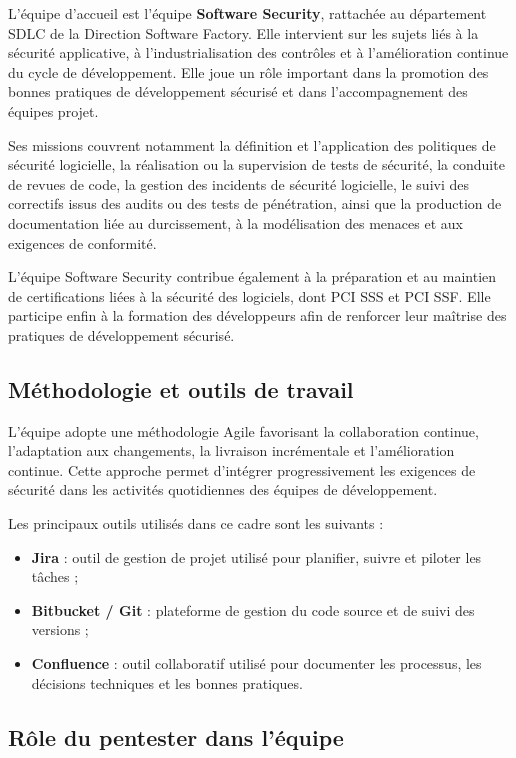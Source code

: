 \documentclass[12pt,a4paper]{report}
\begin{document}
L'équipe d'accueil est l'équipe \textbf{Software Security}, rattachée au département SDLC de la Direction Software Factory. Elle intervient sur les sujets liés à la sécurité applicative, à l'industrialisation des contrôles et à l'amélioration continue du cycle de développement. Elle joue un rôle important dans la promotion des bonnes pratiques de développement sécurisé et dans l'accompagnement des équipes projet.

Ses missions couvrent notamment la définition et l'application des politiques de sécurité logicielle, la réalisation ou la supervision de tests de sécurité, la conduite de revues de code, la gestion des incidents de sécurité logicielle, le suivi des correctifs issus des audits ou des tests de pénétration, ainsi que la production de documentation liée au durcissement, à la modélisation des menaces et aux exigences de conformité.

L'équipe Software Security contribue également à la préparation et au maintien de certifications liées à la sécurité des logiciels, dont PCI SSS et PCI SSF. Elle participe enfin à la formation des développeurs afin de renforcer leur maîtrise des pratiques de développement sécurisé.

\subsection{Méthodologie et outils de travail}

L'équipe adopte une méthodologie Agile favorisant la collaboration continue, l'adaptation aux changements, la livraison incrémentale et l'amélioration continue. Cette approche permet d'intégrer progressivement les exigences de sécurité dans les activités quotidiennes des équipes de développement.

Les principaux outils utilisés dans ce cadre sont les suivants :

\begin{itemize}
    \item \textbf{Jira} : outil de gestion de projet utilisé pour planifier, suivre et piloter les tâches ;
    \item \textbf{Bitbucket / Git} : plateforme de gestion du code source et de suivi des versions ;
    \item \textbf{Confluence} : outil collaboratif utilisé pour documenter les processus, les décisions techniques et les bonnes pratiques.
\end{itemize}

\subsection{Rôle du pentester dans l'équipe}
\end{document}
